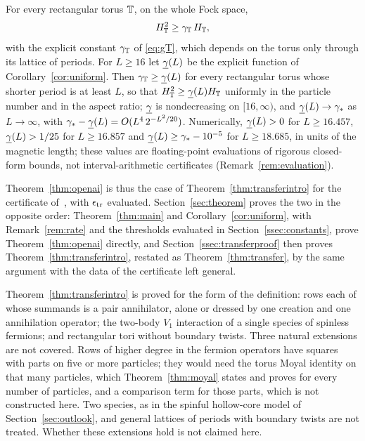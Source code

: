 \begin{theorem}\label{thm:openai}
For every rectangular torus $\mathbb{T}$, on the whole Fock space,
\[
H_{\mathbb{T}}^2\ge\gamma_{\mathbb{T}}\,H_{\mathbb{T}},
\]
with the explicit constant $\gamma_{\mathbb{T}}$ of \eqref{eq:gT}, which depends on the torus only through its lattice of periods. For $L\ge16$ let
$\underline{\gamma}(L)$ be the explicit function of Corollary~\ref{cor:uniform}. Then $\gamma_{\mathbb{T}}\ge\underline{\gamma}(L)$ for every rectangular torus whose shorter period
is at least $L$, so that $H_{\mathbb{T}}^2\ge\underline{\gamma}(L)H_{\mathbb{T}}$ uniformly in the particle number and in the aspect ratio; $\underline{\gamma}$ is nondecreasing on
$[16,\infty)$, and $\underline{\gamma}(L)\to\gamma_{*}$ as $L\to\infty$, with $\gamma_{*}-\underline{\gamma}(L)=O(L^4\,2^{-L^2/20})$. Numerically, $\underline{\gamma}(L)>0$ for $L\ge16.457$,
$\underline{\gamma}(L)>1/25$ for $L\ge16.857$ and $\underline{\gamma}(L)\ge\gamma_{*}-10^{-5}$ for $L\ge18.685$, in units of the magnetic length; these values are
floating-point evaluations of rigorous closed-form bounds, not interval-arithmetic certificates (Remark~\ref{rem:evaluation}).
\end{theorem}

Theorem~\ref{thm:openai} is thus the case of Theorem~\ref{thm:transferintro} for the certificate
of~\cite{OAI:A-Fock-space-inequality-and-the-Laughlin-spectral-gap-September-24-2026}, with $\epsilon_{\mathrm{tr}}$ evaluated. Section~\ref{sec:theorem}
proves the two in the opposite order: Theorem~\ref{thm:main} and Corollary~\ref{cor:uniform}, with Remark~\ref{rem:rate} and the
thresholds evaluated in Section~\ref{ssec:constants}, prove Theorem~\ref{thm:openai} directly, and Section~\ref{ssec:transferproof} then
proves Theorem~\ref{thm:transferintro}, restated as Theorem~\ref{thm:transfer}, by the same argument with the data of the certificate
left general.

\begin{remark}[scope]\label{rem:scope}
Theorem~\ref{thm:transferintro} is proved for the form of the definition: rows each of whose summands is a pair annihilator, alone
or dressed by one creation and one annihilation operator; the two-body $V_1$ interaction of a single species of spinless fermions;
and rectangular tori without boundary twists. Three natural extensions are not covered. Rows of higher degree in the fermion
operators have squares with parts on five or more particles; they would need the torus Moyal identity on that many particles,
which Theorem~\ref{thm:moyal} states and proves for every number of particles, and a comparison term for those parts, which is not
constructed here. Two species, as in the spinful hollow-core model of Section~\ref{sec:outlook}, and general lattices of periods
with boundary twists are not treated. Whether these extensions hold is not claimed here.
\end{remark}

